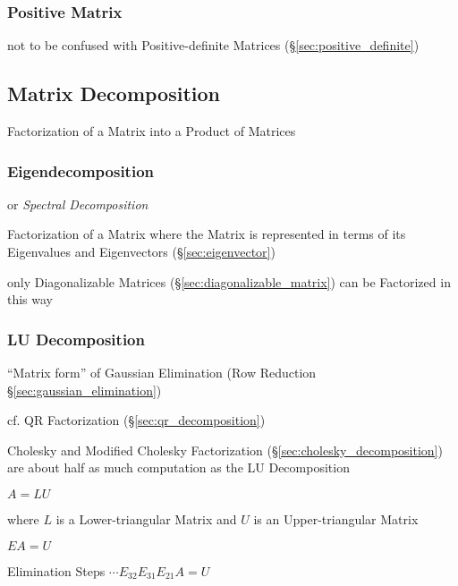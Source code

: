 \subsubsection{Positive Matrix}\label{sec:positive_matrix}

\fist not to be confused with Positive-definite Matrices
(\S\ref{sec:positive_definite})



\subsection{Matrix Decomposition}\label{sec:matrix_decomposition}

Factorization of a Matrix into a Product of Matrices



\subsubsection{Eigendecomposition}\label{sec:eigendecomposition}

or \emph{Spectral Decomposition}

Factorization of a Matrix where the Matrix is represented in terms of its
Eigenvalues and Eigenvectors (\S\ref{sec:eigenvector})

only Diagonalizable Matrices (\S\ref{sec:diagonalizable_matrix}) can be
Factorized in this way



\subsubsection{LU Decomposition}\label{sec:lu_decomposition}

``Matrix form'' of Gaussian Elimination (Row Reduction
\S\ref{sec:gaussian_elimination})

cf. QR Factorization (\S\ref{sec:qr_decomposition})

Cholesky and Modified Cholesky Factorization
(\S\ref{sec:cholesky_decomposition}) are about half as much computation as the
LU Decomposition

$A = LU$

where $L$ is a Lower-triangular Matrix and $U$ is an Upper-triangular Matrix

$EA = U$

Elimination Steps $\cdots E_{32}E_{31}E_{21}A = U$

